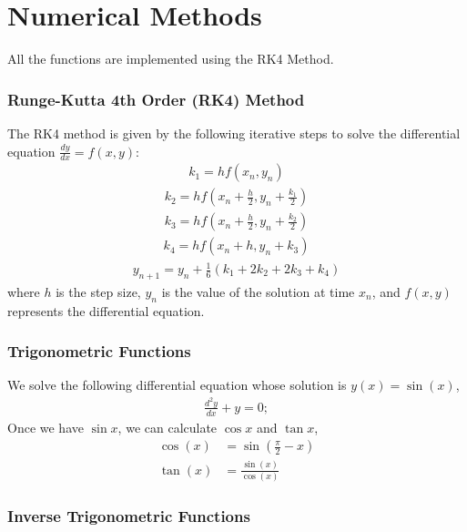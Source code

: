 \documentclass[a4paper,12pt]{article}
\begin{document}
\section*{Numerical Methods}
All the functions are implemented using the RK4 Method.

\subsubsection*{Runge-Kutta 4th Order (RK4) Method}

The RK4 method is given by the following iterative steps to solve the differential equation $ \frac{dy}{dx} = f(x, y) $:
\begin{align}
k_1 = h f(x_n, y_n)
\end{align}
\begin{align}
k_2 = h f\left( x_n + \frac{h}{2}, y_n + \frac{k_1}{2} \right)
\end{align}
\begin{align}
k_3 = h f\left( x_n + \frac{h}{2}, y_n + \frac{k_2}{2} \right)
\end{align}
\begin{align}
k_4 = h f(x_n + h, y_n + k_3)
\end{align}
\begin{align}
y_{n+1} = y_n + \frac{1}{6} \left( k_1 + 2k_2 + 2k_3 + k_4 \right)
\end{align}
where $ h $ is the step size, $ y_n $ is the value of the solution at time $ x_n $, and $ f(x, y) $ represents the differential equation.

\subsubsection*{Trigonometric Functions}
We solve the following differential equation whose solution is $ y(x) = \sin(x) $,
\begin{align}
\frac{d^2y}{dx} + y = 0;
\end{align}
Once we have $\sin{x}$, we can calculate $\cos{x}$ and $\tan{x}$,
\begin{align*} 
 \cos(x) &= \sin \left( \frac{\pi}{2} - x \right)\\ 
 \tan(x) &= \frac{\sin(x)}{\cos(x)}
\end{align*}

\subsubsection*{Inverse Trigonometric Functions}
\end{document}
